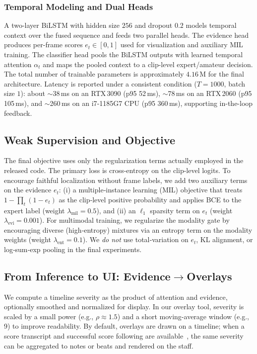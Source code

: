 \documentclass[sigconf,review,anonymous]{acmart}
\begin{document}
\subsubsection{Temporal Modeling and Dual Heads}
A two-layer BiLSTM with hidden size $256$ and dropout $0.2$ models temporal context over the fused sequence and feeds two parallel heads. The evidence head produces per-frame scores $e_t\in[0,1]$ used for visualization and auxiliary MIL training. The classifier head pools the BiLSTM outputs with learned temporal attention $\alpha_t$ and maps the pooled context to a clip-level expert/amateur decision. The total number of trainable parameters is approximately $4.16\,\mathrm{M}$ for the final architecture. Latency is reported under a consistent condition ($T{=}1000$, batch size $1$): about $\sim$38\,ms on an RTX\,3090 (p95 52\,ms), $\sim$78\,ms on an RTX\,2060 (p95 105\,ms), and $\sim$260\,ms on an i7‑1185G7 CPU (p95 360\,ms), supporting in-the-loop feedback.


\subsection{Weak Supervision and Objective}
\label{subsec:weak}
The final objective uses only the regularization terms actually employed in the released code. The primary loss is cross-entropy on the clip-level logits. To encourage faithful localization without frame labels, we add two auxiliary terms on the evidence $e_t$: (i) a multiple‑instance learning (MIL) objective that treats $1-\prod_t(1{-}e_t)$ as the clip‑level positive probability and applies BCE to the expert label (weight $\lambda_{\mathrm{mil}}{=}0.5$), and (ii) an $\ell_1$ sparsity term on $e_t$ (weight $\lambda_{\mathrm{evi}}{=}0.001$). For multimodal training, we regularize the modality gate by encouraging diverse (high‑entropy) mixtures via an entropy term on the modality weights (weight $\lambda_{\mathrm{ent}}{=}0.1$). We \emph{do not} use total‑variation on $e_t$, KL alignment, or log‑sum‑exp pooling in the final experiments.

\subsection{From Inference to UI: Evidence$\rightarrow$Overlays}
\label{subsec:viz}
We compute a timeline severity as the product of attention and evidence, optionally smoothed and normalized for display. In our overlay tool, severity is scaled by a small power (e.g., $\rho\approx1.5$) and a short moving-average window (e.g., 9) to improve readability. By default, overlays are drawn on a timeline; when a score transcript and successful score following are available~\cite{nakamura2016}, the same severity can be aggregated to notes or beats and rendered on the staff.
\end{document}
